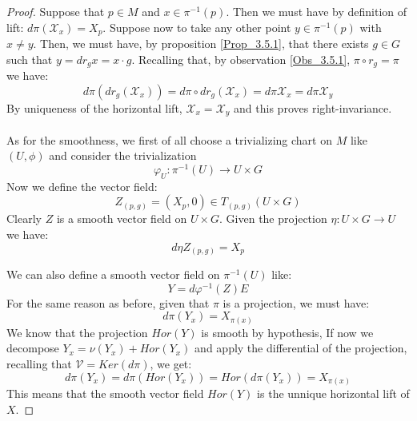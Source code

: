 \documentclass[12pt,a4paper]{report}
\theoremstyle{definition}
\theoremstyle{Theorem}
\theoremstyle{definition}
\theoremstyle{definition}
\begin{document}
	\begin{proof}
		Suppose that $p\in M$ and $x\in\pi^{-1}(p)$. Then we must have by definition of lift: $d\pi(\mathcal{X}_{x})=X_p$. Suppose now to take any other point $y\in\pi^{-1}(p)$ with $x\neq y$. Then, we must have, by proposition \ref{Prop_3.5.1}, that there exists $g\in G$ such that $y=dr_{g}x=x\cdot g$. Recalling that, by observation \ref{Obs_3.5.1}, $\pi\circ r_{g}=\pi$ we have:
		$$d\pi(dr_{g}(\mathcal{X}_{x}))=d\pi\circ dr_{g}(\mathcal{X}_{x})=d\pi\mathcal{X}_{x}=d\pi\mathcal{X}_{y}$$
		By uniqueness of the horizontal lift, $\mathcal{X}_{x}=\mathcal{X}_{y}$ and this proves right-invariance.\\
		\\
		As for the smoothness, we first of all choose a trivializing chart on $M$ like $(U,\phi)$ and consider the trivialization 
		$$\varphi_U:\pi^{-1}(U)\rightarrow U\times G$$
		Now we define the vector field:
		$$Z_{(p,g)}=(X_p,0)\in T_{(p,g)}(U\times G)$$
		Clearly $Z$ is a smooth vector field on $U\times G$. Given the projection $\eta:U\times G\rightarrow U$ we have:
		$$d\eta Z_{(p,g)}=X_p$$
		\begin{comment}
			To see this, note that $d\eta:T(U\times G)\rightarrow TU$ and so we get: $d\eta(Z)\in TU$ is a vector field. In particular, by definition of differential, we must have for any $(p,g)\in U\times G$:
			$$d\eta_{(p,g)}(Z_{(p,g)})f=Z_{(p,g)}(f\circ \eta_{(p,g)})$$
			And since $\eta$ projects the points from $U\times G$ to $U$, we get:
			$$d\eta_{(p,g)}(Z_{(p,g)})=X_p$$
		\end{comment}
		We can also define a smooth vector field on $\pi^{-1}(U)$ like:
		$$Y=d\varphi^{-1}(Z)E$$
		For the same reason as before, given that $\pi$ is a projection, we must have:
		$$d\pi(Y_{x})=X_{\pi(x)}$$
		We know that the projection $Hor(Y)$ is smooth by hypothesis, If now we decompose $Y_{x}=\nu(Y_{x})+Hor(Y_{x})$ and apply the differential of the projection, recalling that $\mathcal{V}=Ker(d\pi)$, we get:
		$$d\pi(Y_{x})=d\pi(Hor(Y_{x}))=Hor(d\pi(Y_{x}))=X_{\pi(x)}$$
		This means that the smooth vector field $Hor(Y)$ is the unnique horizontal lift of $X$.
	\end{proof}
\end{document}
